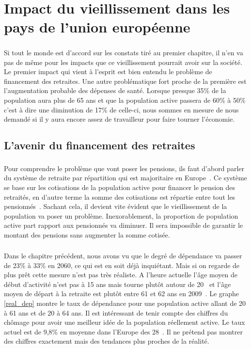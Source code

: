 \chapter{Impact du vieillissement dans les pays de l'union européenne}
\paragraph{}Si tout le monde est d’accord sur les constats tiré au premier chapitre, il n’en va pas de même pour les impacts que ce vieillissement pourrait avoir sur la société. Le premier impact qui vient à l’esprit est bien entendu le problème de financement des retraites. Une autre problématique fort proche de la première est l’augmentation probable des dépenses de santé. Lorsque presque 35\% de la population aura plus de 65 ans et que la population active passera de 60\% à 50\% c’est à dire une diminution de 17\% de celle-ci, nous sommes en mesure de nous demandé si il y aura encore assez de travailleur pour faire tourner l’économie.  

\section{L'avenir du financement des retraites}
\paragraph{}Pour comprendre le problème que vont poser les pensions, ils faut d’abord parler du système de retraite par répartition qui est majoritaire en Europe~\citep{system_retraite}. Ce système se base sur les cotisations de la population active pour financer le pension des retraités, en d’autre terme la somme des cotisations est répartie entre tout les pensionnés~\citep{retraite_repartition}. Sachant cela, il devient vite évident que le vieillissement de la population va poser un problème. Inexorablement, la proportion de population active part rapport aux pensionnés va diminuer. Il sera impossible de garantir le montant des pensions sans augmenter la somme cotisée.  

\paragraph{}Dans le chapitre précédent, nous avons vu que le degré de dépendance va passer de 23\% à 33\% en 2060, ce qui est en soit déjà inquiétant. Mais si on regarde de plus prêt cette mesure n’est pas très réaliste. A l’heure actuelle l’âge moyen de début d’activité n’est pas à 15 ans mais tourne plutôt autour de 20~\citep[pp.27]{eul} et l’âge moyen de départ à la retraite est plutôt entre 61 et 62 ans en 2009~\citep{eurocompar}. Le graphe \ref{real_dep} montre le taux de dépendance pour une population active allant de 20 à 61 ans et de 20 à 64 ans. Il est intéressant de tenir compte des chiffres du chômage pour avoir une meilleur idée de la population réellement active. Le taux actuel est de 9,8\% en moyenne dans l’Europe des 28~\citep{chaumage}. Il ne prétend pas montrer des chiffres exactement mais des tendances plus proches de la réalité. 



